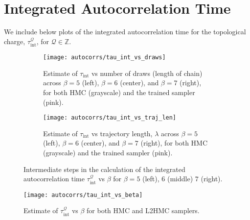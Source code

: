 %
\section{Integrated Autocorrelation Time}%
\label{sec:integrated_autocorrelation_time}
%
We include below plots of the integrated autocorrelation time for the
topological charge, \(\tau_{\mathrm{int}}^{\mathcal{Q}}\), for \(\mathcal{Q}
\in \mathbb{Z}\).
%
\begin{figure}[htpb]
  \centering
  \begin{subfigure}{\textwidth}
    \centering
    \texttt{[image: autocorrs/tau\_int\_vs\_draws]}%
    \caption{\label{fig:tau_int_vs_draws}Estimate of \(\tau_\mathrm{int}\) vs
      number of draws (length of chain) across \(\beta = 5\) (left), \(\beta =
      6\) (center), and \(\beta = 7\) (right), for both HMC (grayscale) and the
    trained sampler (pink).}
  \end{subfigure}
  \begin{subfigure}{\textwidth}
    \centering
    \texttt{[image: autocorrs/tau\_int\_vs\_traj\_len]}
    \caption{\label{fig:tau_int_vs_traj_len}Estimate of \(\tau_{\mathrm{int}}\)
      vs trajectory length, \(\lambda\) across \(\beta = 5\) (left), \(\beta =
      6\) (center), and \(\beta = 7\) (right), for both HMC (grayscale) and the
    trained sampler (pink).}
  \end{subfigure}%
  \caption{Intermediate steps in the calculation of the integrated
    autocorrelation time \(\tau_{\mathrm{int}}^{\mathcal{Q}}\) vs \(\beta\) for
  \(\beta = 5\) (left), \(6\) (middle) \(7\) (right).}
\end{figure}
%
\begin{figure}[htpb]
  \centering
  \texttt{[image: autocorrs/tau\_int\_vs\_beta]}
  \caption{Estimate of \(\tau_{\mathrm{int}}^{\mathcal{Q}}\) vs \(\beta\) for both
    HMC and L2HMC samplers.}%
  \label{fig:tau_int_vs_beta}
\end{figure}
